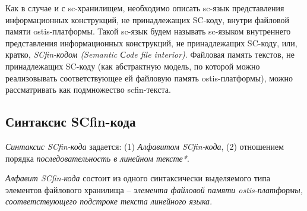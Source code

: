 Как в случае и с sc-хранилищем, необходимо описать sc-язык представления информационных конструкций, не принадлежащих SC-коду, внутри файловой памяти ostis-платформы. Такой sc-язык будем называть sc-языком внутреннего представления информационных конструкций, не принадлежащих SC-коду, или, кратко, \textit{SCfin-кодом (Semantic Сode file interior)}. Файловая память текстов, не принадлежащих SC-коду (как абстрактную модель, по которой можно реализовывать соответствующее ей файловую память ostis-платформы), можно рассматривать как подмножество scfin-текста.

\begin{SCn}
\begin{scnindent}
\end{scnindent}
\end{SCn}

\subsection{Синтаксис SCfin-кода}
\label{sec_soft_platform_scfin_code_alphabet_and_syntax}

\textit{Синтаксис SCfin-кода} задается: (1) \textit{Алфавитом SCfin-кода}, (2) отношением порядка \textit{последовательность в линейном тексте*}.

\begin{SCn}
\begin{scneqtoset}
\end{scneqtoset}
\end{SCn}

\textit{Алфавит SCfin-кода\scnsupergroupsign} состоит из одного синтаксически выделяемого типа элементов файлового хранилища -- \textit{элемента файловой памяти ostis-платформы, соответствующего подстроке текста линейного языка}.

